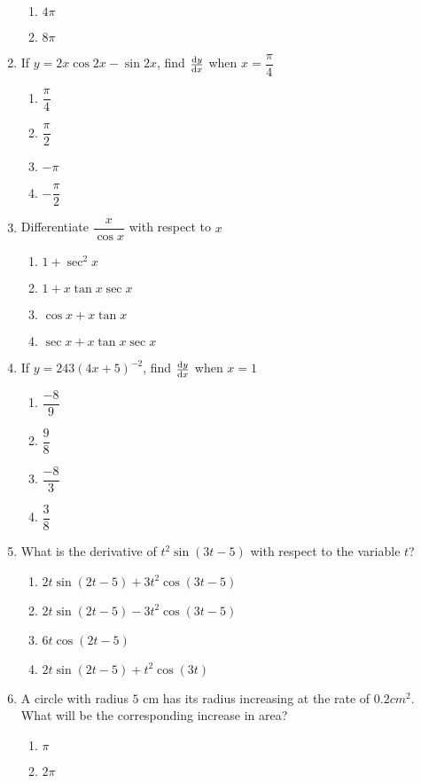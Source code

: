 \begin{multicols}{2}
\begin{enumerate}[label={\arabic*.}]
\begin{enumerate}[label={\Alph*.}]
\item \(4\pi\)
\item \(8\pi\)
\end{enumerate}
\item If \(y = 2x\cos{2x}-\sin{2x}\), find \(\dv{y}{x}\) when \(x = \dfrac{\pi}{4}\)
\begin{enumerate}[label={\Alph*.}]
\item \(\dfrac{\pi}{4}\)
\item \(\dfrac{\pi}{2}\)
\item \(-\pi\)
\item \(-{\dfrac{\pi}{2}}\)
\end{enumerate}
\item Differentiate \(\dfrac{x}{\cos x}\) with respect to \(x\)
\begin{enumerate}[label={\Alph*.}]
\item \(1 + \sec^{2}x\)
\item \(1 + x\tan x\sec x\)
\item \(\cos x + x\tan x \)
\item \(\sec x + x\tan x \sec x\)
\end{enumerate}
\item If \(y = 243{(4x+5)}^{-2}\), find \(\dv{y}{x}\) when \(x = 1\)
\begin{enumerate}[label={\Alph*.}]
\item \(\dfrac{-8}{9}\)
\item \(\dfrac{9}{8}\)
\item \(\dfrac{-8}{3}\)
\item \(\dfrac{3}{8}\)
\end{enumerate}
\item What is the derivative of \({t}^{2}\sin(3t-5)\) with respect to the variable \(t\)?
\begin{enumerate}[label={\Alph*.}]
\item \(2t \sin(2t-5) + 3{t}^2\cos(3t-5)\)
\item \(2t \sin(2t-5) - 3{t}^2\cos(3t-5)\)
\item \(6t\cos(2t-5)\)
\item \(2t \sin(2t-5) + t^2\cos(3t)\)
\end{enumerate}
\item A circle with radius \(5\) cm has its radius increasing at the rate of \(0.2 {cm}^2\). What will be the corresponding increase in area?
\begin{enumerate}[label={\Alph*.}]
\item \(\pi\)
\item \(2\pi\)

\end{enumerate}
\end{enumerate}
\end{multicols}
